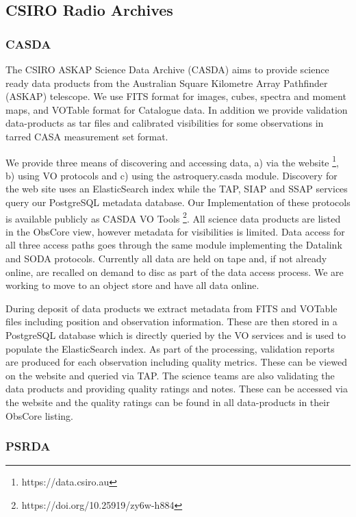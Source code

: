 \documentclass[11pt,a4paper]{ivoa}
\begin{document}
\subsection{CSIRO Radio Archives}\label{sec:CASDA}

\subsubsection{CASDA}

The CSIRO ASKAP Science Data Archive (CASDA) aims to provide science ready data products from the Australian Square Kilometre Array Pathfinder (ASKAP) telescope. 
We use FITS format for images, cubes, spectra and moment maps, and VOTable format for Catalogue data. 
In addition we provide validation data-products as tar files and calibrated visibilities for some observations in tarred CASA measurement set format.

We provide three means of discovering and accessing data, a) via the website \footnote{https://data.csiro.au}, b) using VO protocols and c) using the astroquery.casda module. 
Discovery for the web site uses an ElasticSearch index while the TAP, SIAP and SSAP services query our PostgreSQL metadata database. 
Our Implementation of these protocols is available publicly as CASDA VO Tools \footnote{https://doi.org/10.25919/zy6w-h884}.
All science data products are listed in the ObsCore view, however metadata for visibilities is limited. 
Data access for all three access paths goes through the same module implementing the Datalink and SODA protocols. 
Currently all data are held on tape and, if not already online, are recalled on demand to disc as part of the data access process. 
We are working to move to an object store and have all data online.

During deposit of data products we extract metadata from FITS and VOTable files including position and observation information.
These are then stored in a PostgreSQL database which is directly queried by the VO services and is used to populate the ElasticSearch index.
As part of the processing, validation reports are produced for each observation including quality metrics.
These can be viewed on the website and queried via TAP.
The science teams are also validating the data products and providing quality ratings and notes.
These can be accessed via the website and the quality ratings can be found in all data-products in their ObsCore listing.

\subsubsection{PSRDA}
\end{document}
